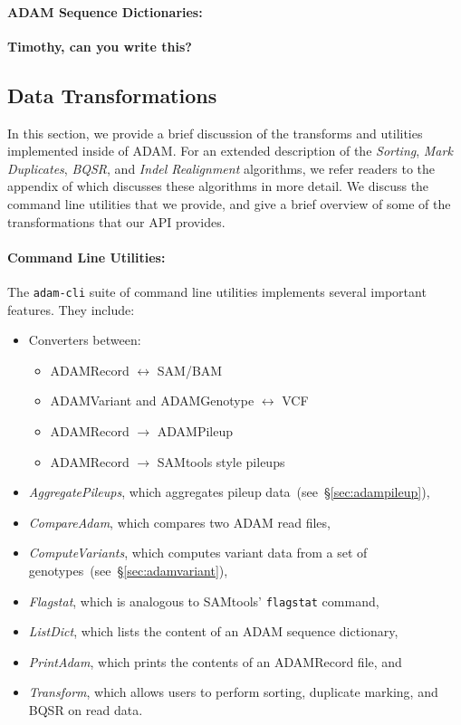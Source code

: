 \documentclass{bioinfo}
\begin{document}
\paragraph{ADAM Sequence Dictionaries:}
\label{sec:adam-sequence-dictionaries}

\textbf{Timothy, can you write this?}

\subsection{Data Transformations}
\label{sec:data-transformations}

In this section, we provide a brief discussion of the transforms and utilities implemented inside of ADAM. For an extended description of the \textit{Sorting}, \textit{Mark
Duplicates}, \textit{BQSR}, and \textit{Indel Realignment} algorithms, we refer readers to the appendix of \citet{massie13} which discusses these algorithms in more detail.
We discuss the command line utilities that we provide, and give a brief overview of some of the transformations that our API provides.

\paragraph{Command Line Utilities:}
\label{sec:command-line-utilities}

The \texttt{adam-cli} suite of command line utilities implements several important features. They include:

\begin{itemize}
\item Converters between:
\begin{itemize}
\item ADAMRecord $\leftrightarrow$ SAM/BAM
\item ADAMVariant and ADAMGenotype $\leftrightarrow$ VCF
\item ADAMRecord $\rightarrow$ ADAMPileup
\item ADAMRecord $\rightarrow$ SAMtools style pileups 
\end{itemize}
\item \textit{AggregatePileups}, which aggregates pileup data~(see~\S\ref{sec:adampileup}),
\item \textit{CompareAdam}, which compares two ADAM read files,
\item \textit{ComputeVariants}, which computes variant data from a set of genotypes~(see~\S\ref{sec:adamvariant}),
\item \textit{Flagstat}, which is analogous to SAMtools' \texttt{flagstat} command,
\item \textit{ListDict}, which lists the content of an ADAM sequence dictionary,
\item \textit{PrintAdam}, which prints the contents of an ADAMRecord file, and
\item \textit{Transform}, which allows users to perform sorting, duplicate marking, and BQSR on read data.
\end{itemize}
\end{document}
